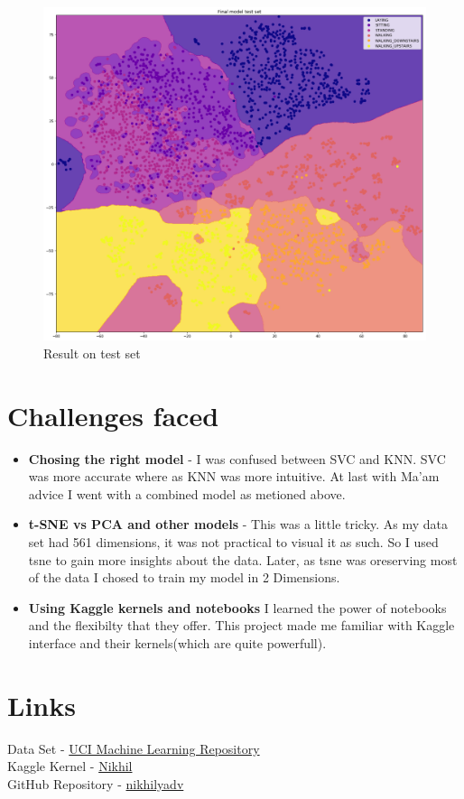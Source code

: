 \documentclass[12pt]{article}
\begin{document}
\begin{figure}[H]
	\centering
	\includegraphics[scale=0.30]{result_test.png}
	\caption{Result on test set}
\end{figure}\noindent
\section{Challenges faced}
\begin{itemize}
	\item \textbf{Chosing the right model} - I was confused between SVC and KNN. SVC was more accurate where as KNN was more intuitive. At last with Ma'am advice I went with a combined model as metioned above.
	\item \textbf{t-SNE vs PCA and other models} - This was a little tricky. As my data set had 561 dimensions, it was not practical to visual it as such. So I used tsne to gain more insights about the data. Later, as tsne was oreserving most of the data I chosed to train my model in 2 Dimensions.
	\item \textbf{Using Kaggle kernels and notebooks} I learned the power of notebooks and the flexibilty that they offer. This project made me familiar with Kaggle interface and their kernels(which are quite powerfull).
\end{itemize}
\section{Links}
	Data Set - \href{https://archive.ics.uci.edu/ml/datasets/Human+Activity+Recognition+Using+Smartphones}{UCI Machine Learning Repository}\\
	Kaggle Kernel - \href{https://www.kaggle.com/nikhilyadv/kernelb8e59d4169}{Nikhil}\\
	GitHub Repository - \href{https://github.com/nikhilyadv/Human-Activity-Detection}{nikhilyadv}
\end{document}
